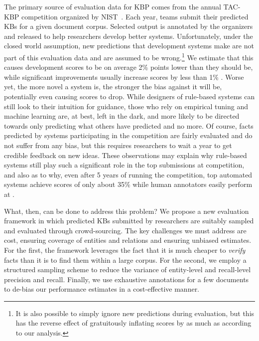 The primary source of evaluation data for KBP comes from the annual TAC-KBP competition organized by NIST~\citep{}. %
Each year, teams submit their predicted KBs for a given document corpus.
Selected output is annotated by the organizers and released to help researchers develop better systems.
Unfortunately, under the closed world assumption, new predictions that development systems make are not part of this evaluation data and are assumed to be wrong.\footnote{%
It is also possible to simply ignore new predictions during evaluation, but this has the reverse effect of gratuitously inflating scores by as much as  according to our analysis.}
We estimate that this causes development \fone{} scores to be on average 2\% points lower than they should be, while significant improvements usually increase scores by less than 1\% \fone{}.
Worse yet, the more novel a system is, the stronger the bias against it will be, potentially even causing scores to drop.
While designers of rule-based systems can still look to their intuition for guidance, those who rely on empirical tuning and machine learning are, at best, left in the dark, and more likely to be directed towards only predicting what others have predicted and no more.
Of course, facts predicted by systems participating in the competition are fairly evaluated and do not suffer from any bias, but this requires researchers to wait a year to get credible feedback on new ideas.
%
These observations may explain why rule-based systems still play such a significant role in the top submissions at competition, and also as to why, even after 5 years of running the competition, top automated systems achieve scores of only about 35\%\fone{} while human annotators easily perform at .

What, then, can be done to address this problem?
We propose a new evaluation framework in which predicted KBs submitted by researchers are suitably sampled and evaluated through crowd-sourcing.
The key challenges we must address are cost, ensuring coverage of entities and relations and ensuring unbiased estimates.
For the first, the framework leverages the fact that it is much cheaper to \textit{verify} facts than it is to find them within a large corpus.
For the second, we employ a structured sampling scheme to reduce the variance of entity-level and recall-level precision and recall.
Finally, we use exhaustive annotations for a few documents to de-bias our performance estimates in a cost-effective manner.

